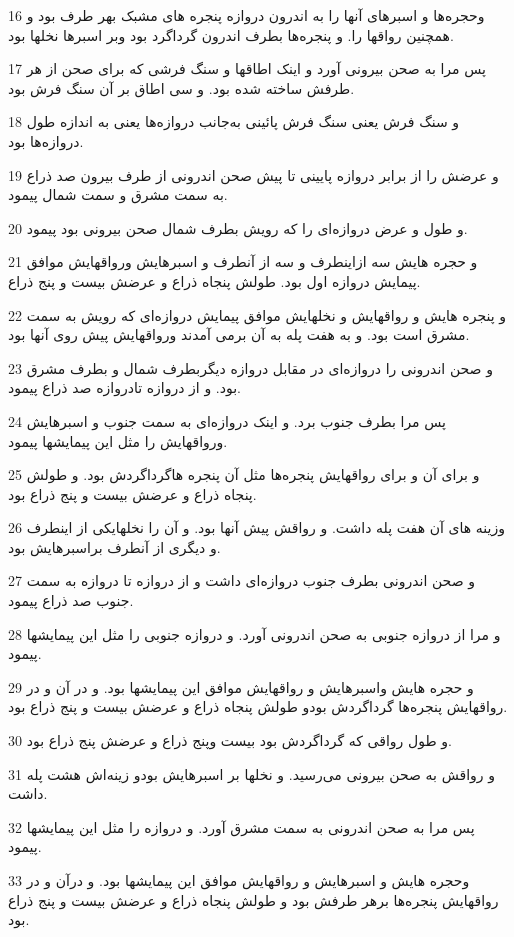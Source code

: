 \par 16 وحجره‌ها و اسبرهای آنها را به اندرون دروازه پنجره های مشبک بهر طرف بود و همچنین رواقها را. و پنجره‌ها بطرف اندرون گرداگرد بود وبر اسبرها نخلها بود.
\par 17 پس مرا به صحن بیرونی آورد و اینک اطاقها و سنگ فرشی که برای صحن از هر طرفش ساخته شده بود. و سی اطاق بر آن سنگ فرش بود.
\par 18 و سنگ فرش یعنی سنگ فرش پائینی به‌جانب دروازه‌ها یعنی به اندازه طول دروازه‌ها بود.
\par 19 و عرضش را از برابر دروازه پایینی تا پیش صحن اندرونی از طرف بیرون صد ذراع به سمت مشرق و سمت شمال پیمود.
\par 20 و طول و عرض دروازه‌ای را که رویش بطرف شمال صحن بیرونی بود پیمود.
\par 21 و حجره هایش سه ازاینطرف و سه از آنطرف و اسبرهایش ورواقهایش موافق پیمایش دروازه اول بود. طولش پنجاه ذراع و عرضش بیست و پنج ذراع.
\par 22 و پنجره هایش و رواقهایش و نخلهایش موافق پیمایش دروازه‌ای که رویش به سمت مشرق است بود. و به هفت پله به آن برمی آمدند ورواقهایش پیش روی آنها بود.
\par 23 و صحن اندرونی را دروازه‌ای در مقابل دروازه دیگربطرف شمال و بطرف مشرق بود. و از دروازه تادروازه صد ذراع پیمود.
\par 24 پس مرا بطرف جنوب برد. و اینک دروازه‌ای به سمت جنوب و اسبرهایش ورواقهایش را مثل این پیمایشها پیمود.
\par 25 و برای آن و برای رواقهایش پنجره‌ها مثل آن پنجره هاگرداگردش بود. و طولش پنجاه ذراع و عرضش بیست و پنج ذراع بود.
\par 26 وزینه های آن هفت پله داشت. و رواقش پیش آنها بود. و آن را نخلهایکی از اینطرف و دیگری از آنطرف براسبرهایش بود.
\par 27 و صحن اندرونی بطرف جنوب دروازه‌ای داشت و از دروازه تا دروازه به سمت جنوب صد ذراع پیمود.
\par 28 و مرا از دروازه جنوبی به صحن اندرونی آورد. و دروازه جنوبی را مثل این پیمایشها پیمود.
\par 29 و حجره هایش واسبرهایش و رواقهایش موافق این پیمایشها بود. و در آن و در رواقهایش پنجره‌ها گرداگردش بودو طولش پنجاه ذراع و عرضش بیست و پنج ذراع بود.
\par 30 و طول رواقی که گرداگردش بود بیست وپنج ذراع و عرضش پنج ذراع بود.
\par 31 و رواقش به صحن بیرونی می‌رسید. و نخلها بر اسبرهایش بودو زینه‌اش هشت پله داشت.
\par 32 پس مرا به صحن اندرونی به سمت مشرق آورد. و دروازه را مثل این پیمایشها پیمود.
\par 33 وحجره هایش و اسبرهایش و رواقهایش موافق این پیمایشها بود. و درآن و در رواقهایش پنجره‌ها برهر طرفش بود و طولش پنجاه ذراع و عرضش بیست و پنج ذراع بود.

